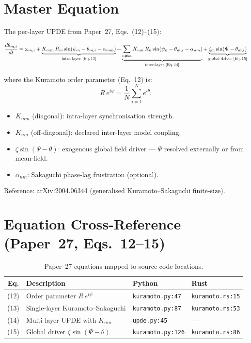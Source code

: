 \documentclass[11pt,a4paper]{article}
\begin{document}
\section{Master Equation}

The per-layer UPDE from Paper~27, Eqs.~(12)--(15):

\begin{equation}\label{eq:upde}
  \frac{d\theta_{m,i}}{dt} = \omega_{m,i}
    + \underbrace{K_{mm}\,R_m\sin(\psi_m - \theta_{m,i} - \alpha_{mm})}_{\text{intra-layer [Eq.\,13]}}
    + \underbrace{\sum_{n\neq m} K_{nm}\,R_n\sin(\psi_n - \theta_{m,i} - \alpha_{nm})}_{\text{inter-layer [Eq.\,14]}}
    + \underbrace{\zeta_m\sin(\Psi - \theta_{m,i})}_{\text{global driver [Eq.\,15]}}
\end{equation}

where the Kuramoto order parameter (Eq.~12) is:
\begin{equation}\label{eq:order}
  R\,e^{i\psi} = \frac{1}{N}\sum_{j=1}^{N} e^{i\theta_j}
\end{equation}

\begin{itemize}
  \item $K_{mm}$ (diagonal): intra-layer synchronisation strength.
  \item $K_{nm}$ (off-diagonal): declared inter-layer model coupling.
  \item $\zeta\sin(\Psi-\theta)$: exogenous global field driver ---
        $\Psi$ resolved externally or from mean-field.
  \item $\alpha_{nm}$: Sakaguchi phase-lag frustration (optional).
\end{itemize}

Reference: arXiv:2004.06344 (generalised Kuramoto--Sakaguchi finite-size).


\section{Equation Cross-Reference (Paper~27, Eqs.~12--15)}

\begin{table}[h]
\centering
\begin{tabular}{@{}clll@{}}
\toprule
\textbf{Eq.} & \textbf{Description} & \textbf{Python} & \textbf{Rust} \\
\midrule
(12) & Order parameter $R\,e^{i\psi}$ &
  \texttt{kuramoto.py:47} & \texttt{kuramoto.rs:15} \\
(13) & Single-layer Kuramoto--Sakaguchi &
  \texttt{kuramoto.py:87} & \texttt{kuramoto.rs:53} \\
(14) & Multi-layer UPDE with $K_{nm}$ &
  \texttt{upde.py:45} & --- \\
(15) & Global driver $\zeta\sin(\Psi-\theta)$ &
  \texttt{kuramoto.py:126} & \texttt{kuramoto.rs:86} \\
\bottomrule
\end{tabular}
\caption{Paper~27 equations mapped to source code locations.}
\label{tab:eqref}
\end{table}
\end{document}
